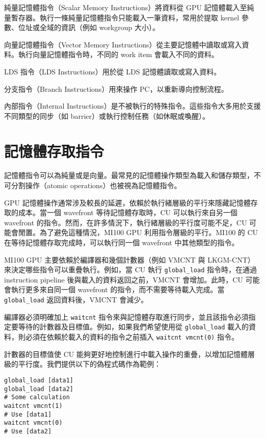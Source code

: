 純量記憶體指令（Scalar Memory Instructions）將資料從 GPU 記憶體載入至純量暫存器。執行一條純量記憶體指令只能載入一筆資料，常用於提取 kernel 參數、位址或全域的資訊（例如 workgroup 大小）。

向量記憶體指令（Vector Memory Instructions）從主要記憶體中讀取或寫入資料。執行向量記憶體指令時，不同的 work item 會載入不同的資料。

LDS 指令（LDS Instructions）用於從 LDS 記憶體讀取或寫入資料。

分支指令（Branch Instructions）用來操作 PC，以重新導向控制流程。

內部指令（Internal Instructions）是不被執行的特殊指令。這些指令大多用於支援不同類型的同步（如 barrier）或執行控制任務（如休眠或喚醒）。


\section{記憶體存取指令}
\label{sec:memory_access_instructions}

記憶體指令可以為純量或是向量。最常見的記憶體操作類型為載入和儲存類型，不可分割操作（atomic operations）也被視為記憶體指令。

GPU 記憶體操作通常涉及較長的延遲，依賴於執行緒層級的平行來隱藏記憶體存取的成本。當一個 wavefront 等待記憶體存取時，CU 可以執行來自另一個 wavefront 的指令。然而，在許多情況下，執行緒層級的平行度可能不足，CU 可能會閒置。為了避免這種情況，MI100 GPU 利用指令層級的平行。MI100 的 CU 在等待記憶體存取完成時，可以執行同一個 wavefront 中其他類型的指令。

MI100 GPU 主要依賴於編譯器和幾個計數器（例如 VMCNT 與 LKGM-CNT）來決定哪些指令可以重疊執行。例如，當 CU 執行 \lstinline|global_load| 指令時，在通過 instruction pipeline 後與載入的資料返回之前，VMCNT 會增加。此時，CU 可能會執行更多來自同一個 wavefront 的指令，而不需要等待載入完成。當 \lstinline|global_load| 返回資料後，VMCNT 會減少。

編譯器必須明確加上 \lstinline|waitcnt| 指令來與記憶體存取進行同步，並且該指令必須指定要等待的計數器及目標值。例如，如果我們希望使用從 \lstinline|global_load| 載入的資料，則必須在依賴於載入的資料的指令之前插入 \lstinline|waitcnt vmcnt(0)| 指令。

計數器的目標值使 CU 能夠更好地控制進行中載入操作的重疊，以增加記憶體層級的平行度。我們提供以下的偽程式碼作為範例：

\begin{lstlisting}[caption={記憶體載入的偽程式碼}]
global_load [data1]
global_load [data2]
# Some calculation
waitcnt vmcnt(1)
# Use [data1]
waitcnt vmcnt(0)
# Use [data2]
\end{lstlisting}

